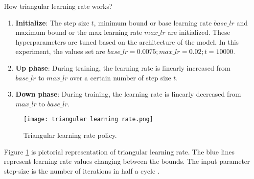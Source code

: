 How triangular learning rate works?

\begin{enumerate}
    \item \textbf{Initialize}: The step size $ t $, minimum bound or base learning rate $ base\_lr$ and maximum bound or the max learning rate  $max\_lr$ are initialized. These hyperparameters are tuned based on the architecture of the model. In this experiment, the values set are  $ base\_lr=0.0075 ; max\_lr=0.02; t=10000$.
    \item  \textbf{Up phase}: During training, the learning rate is linearly increased from $ base\_lr$ to $max\_lr$ over a certain number of step size $ t $.
    \item \textbf{Down phase}: During training, the learning rate is linearly decreased from $max\_lr$ to $base\_lr$.
\end{enumerate}

\begin{figure}[H]
    \centering    
    \texttt{[image: triangular learning rate.png]}
    \caption{Triangular learning rate policy.  \parencite{Smith.03062015}
    }
    \label{fig:trl}
\end{figure}
 Figure \ref{fig:trl} is pictorial representation of triangular learning rate. The blue lines represent learning rate values changing between the bounds. The input parameter step-size is the number of iterations in half a cycle \parencite{Smith.03062015}.

